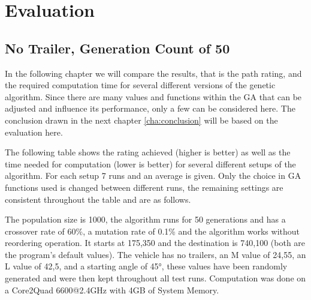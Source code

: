 \chapter{Evaluation}
\label{cha:evaluation}

\section{No Trailer, Generation Count of 50}
\label{sec:no_trailer_50}

In the following chapter we will compare the results, that is the path rating, and the required computation time for several different versions of the genetic algorithm.
Since there are many values and functions within the GA that can be adjusted and influence its performance, only a few can be considered here. The conclusion drawn in the next chapter \ref{cha:conclusion} will be based on the evaluation here.

The following table shows the rating achieved (higher is better) as well as the time needed for computation (lower is better) for several different setups of the algorithm. For each setup 7 runs and an average is given. Only the choice in GA functions used is changed between different runs, the remaining settings are consistent throughout the table and are as follows.

The population size is 1000, the algorithm runs for 50 generations and has a crossover rate of 60\%, a mutation rate of 0.1\% and the algorithm works without reordering operation. It starts at 175,350 and the destination is 740,100 (both are the program's default values). The vehicle has no trailers, an M value of 24,55, an L value of 42,5, and a starting angle of 45°, these values have been randomly generated and were then kept throughout all test runs.
Computation was done on a Core2Quad 6600@2.4GHz with 4GB of System Memory.

